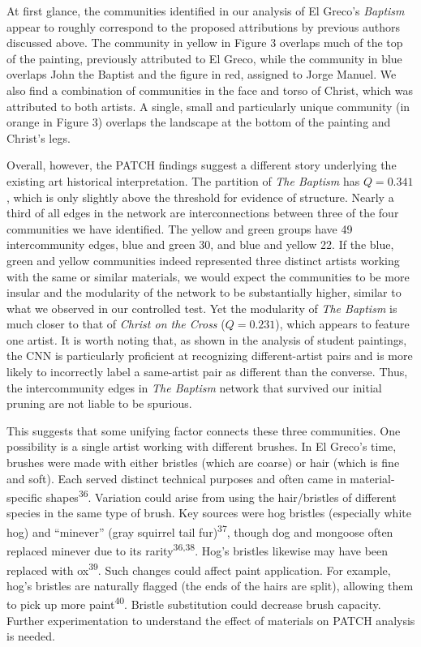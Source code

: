 \documentclass[11pt]{article}
\begin{document}
At first glance, the communities identified in our analysis of El
Greco's \emph{Baptism} appear to roughly correspond to the proposed
attributions by previous authors discussed above. The community in
yellow in Figure 3 overlaps much of the top of the painting, previously
attributed to El Greco, while the community in blue overlaps John the
Baptist and the figure in red, assigned to Jorge Manuel. We also find a
combination of communities in the face and torso of Christ, which was
attributed to both artists. A single, small and particularly unique
community (in orange in Figure 3) overlaps the landscape at the bottom
of the painting and Christ's legs.

Overall, however, the PATCH findings suggest a different story
underlying the existing art historical interpretation. The partition of
\emph{The Baptism} has $Q = 0.341$, which is only slightly above the
threshold for evidence of structure. Nearly a third of all edges in the
network are interconnections between three of the four communities we
have identified. The yellow and green groups have 49 intercommunity
edges, blue and green 30, and blue and yellow 22. If the blue, green and
yellow communities indeed represented three distinct artists working
with the same or similar materials, we would expect the communities to
be more insular and the modularity of the network to be substantially
higher, similar to what we observed in our controlled test. Yet the
modularity of \emph{The Baptism} is much closer to that of \emph{Christ
on the Cross} ($Q = 0.231$), which appears to feature one artist\emph{.}
It is worth noting that, as shown in the analysis of student paintings,
the CNN is particularly proficient at recognizing different-artist pairs
and is more likely to incorrectly label a same-artist pair as different
than the converse. Thus, the intercommunity edges in \emph{The Baptism}
network that survived our initial pruning are not liable to be spurious.

This suggests that some unifying factor connects these three
communities. One possibility is a single artist working with different
brushes. In El Greco's time, brushes were made with either bristles
(which are coarse) or hair (which is fine and soft). Each served
distinct technical purposes and often came in material-specific
shapes\textsuperscript{36}. Variation could arise from using the
hair/bristles of different species in the same type of brush. Key
sources were hog bristles (especially white hog) and ``minever'' (gray
squirrel tail fur)\textsuperscript{37}, though dog and mongoose often
replaced minever due to its rarity\textsuperscript{36,38}. Hog's bristles likewise may have
been replaced with ox\textsuperscript{39}. Such changes could affect
paint application. For example, hog's bristles are naturally flagged
(the ends of the hairs are split), allowing them to pick up more
paint\textsuperscript{40}. Bristle substitution could decrease brush
capacity. Further experimentation to understand the effect of materials
on PATCH analysis is needed.
\end{document}
